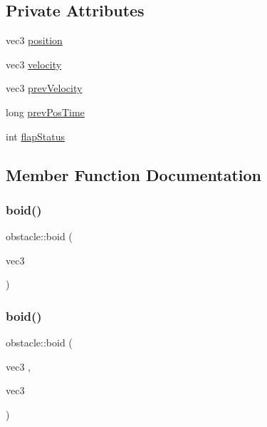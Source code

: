\subsection*{Private Attributes}
\begin{DoxyCompactItemize}
\item 
vec3 \mbox{\hyperlink{classobstacle_ab64654020e39d648c9cdb964381539c7}{position}}
\item 
vec3 \mbox{\hyperlink{classobstacle_a4c1053819a6cfdecfdb9903224154b5a}{velocity}}
\item 
vec3 \mbox{\hyperlink{classobstacle_adf95e00ffb6277989021978958775acd}{prev\+Velocity}}
\item 
long \mbox{\hyperlink{classobstacle_a5a158be912520758d684c78a1102ec5e}{prev\+Pos\+Time}}
\item 
int \mbox{\hyperlink{classobstacle_aad28a67e921d3bb75d3e8e61824b170b}{flap\+Status}}
\end{DoxyCompactItemize}


\subsection{Member Function Documentation}
\mbox{\label{classobstacle_abcaa89feecd5d64beeb2c5b6862ea6ae}} 
\subsubsection{\texorpdfstring{boid()}{boid()}\hspace{0.1cm}{\footnotesize\ttfamily [1/2]}}
{\footnotesize\ttfamily obstacle\+::boid (\begin{DoxyParamCaption}\item[{vec3}]{ }\end{DoxyParamCaption})}

\mbox{\label{classobstacle_a162c493ffaf30b68495fb927414962c1}} 
\subsubsection{\texorpdfstring{boid()}{boid()}\hspace{0.1cm}{\footnotesize\ttfamily [2/2]}}
{\footnotesize\ttfamily obstacle\+::boid (\begin{DoxyParamCaption}\item[{vec3}]{,  }\item[{vec3}]{ }\end{DoxyParamCaption})}

